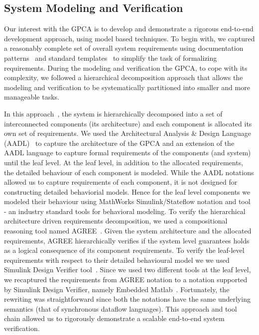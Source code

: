 \subsection {System Modeling and Verification}
\vspace{-0.1in}
Our interest with the GPCA is to develop and demonstrate a rigorous end-to-end development approach, using model based techniques. To begin with, we captured a reasonably complete set of overall system requirements using documentation patterns~\cite{mavin2009easy} and standard templates~\cite{IEEESRS} to simplify the task of formalizing requirements. During the modeling and verification the GPCA, to cope with its complexity, we followed a hierarchical decomposition approach that allows the modeling and verification to be systematically partitioned into smaller and more manageable tasks. 

In this approach~\cite{hilt2013}, the system is hierarchically decomposed into a set of interconnected components (its architecture) and each component is allocated its own set of requirements. We used the Architectural Analysis \& Design Language (AADL)~\cite{AADL:Overview} to capture the architecture of the GPCA and an extension of the AADL language to capture formal requirements of the components (and system) until the leaf level. At the leaf level, in addition to the allocated requirements, the detailed behaviour of each component is modeled. While the AADL notations allowed us to capture requirements of each component, it is not designed for constructing detailed behaviorial models. Hence for the leaf level components we modeled their behaviour using MathWorks Simulink/Stateflow notation and tool~\cite{MathWorks} - an industry standard tools for behavioral modeling. To verify the hierarchical architecture driven requirements decomposition, we used a compositional reasoning tool named AGREE~\cite{NFM2012:CoGaMiWhLaLu}. Given the system architecture and the allocated requirements, AGREE hierarchically verifies if the system level guarantees holds as a logical consequence of its component requirements. To verify the leaf-level requirements with respect to their detailed behavioural model we we used Simulink Design Verifier tool~\cite{MathWorks}. Since we used two different tools at the leaf level, we recaptured the requirements from AGREE notation to a notation supported by Simulink Design Verifier, namely Embedded Matlab~\cite{MathWorks}. Fortunately, the rewriting was straightforward since both the notations have the same underlying semantics (that of synchronous dataflow languages). This approach and tool chain allowed us to rigorously demonstrate a scalable end-to-end system verification.

